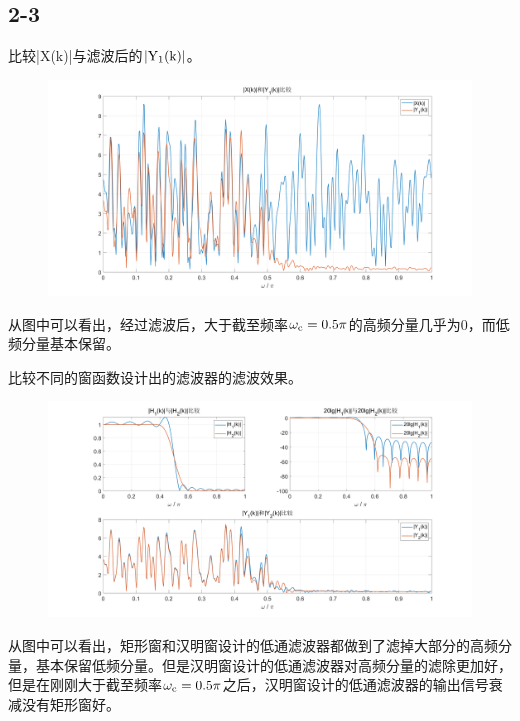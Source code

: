\documentclass{../source/Experiment}
\begin{document}
\subsection{2-3}
比较|X(k)|与滤波后的$\rm |Y_1(k)|$。
\begin{figure}[H]
    \centering
    \includegraphics[width = 1\textwidth]{src/exp4-2-3-1.png}
\end{figure}
从图中可以看出，经过滤波后，大于截至频率$\rm \omega _c = 0.5 \pi$的高频分量几乎为0，而低频分量基本保留。

比较不同的窗函数设计出的滤波器的滤波效果。
\begin{figure}[H]
    \centering
    \includegraphics[width = 1\textwidth]{src/exp4-2-3-2.png}
\end{figure}
从图中可以看出，矩形窗和汉明窗设计的低通滤波器都做到了滤掉大部分的高频分量，基本保留低频分量。但是汉明窗设计的低通滤波器对高频分量的滤除更加好，但是在刚刚大于截至频率$\rm \omega _c = 0.5 \pi$之后，汉明窗设计的低通滤波器的输出信号衰减没有矩形窗好。
\end{document}
